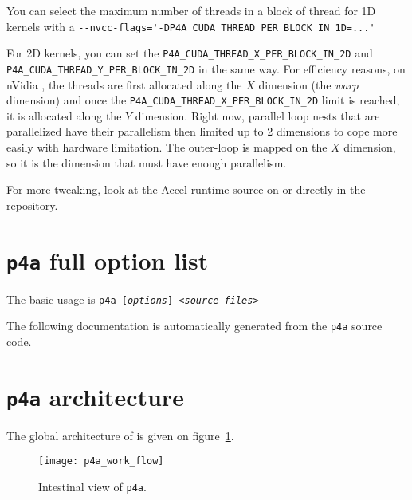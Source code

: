 \documentclass[a4paper]{article}
\begin{document}
You can select the maximum number of threads in a block of thread for 1D
kernels with a \verb|--nvcc-flags='-DP4A_CUDA_THREAD_PER_BLOCK_IN_1D=...'|

For 2D kernels, you can set the \verb|P4A_CUDA_THREAD_X_PER_BLOCK_IN_2D|
and \verb|P4A_CUDA_THREAD_Y_PER_BLOCK_IN_2D| in the same way. For
efficiency reasons, on nVidia \Agpu, the threads are first allocated along
the $X$ dimension (the \emph{warp} dimension) and once the
\verb|P4A_CUDA_THREAD_X_PER_BLOCK_IN_2D| limit is reached, it is allocated
along the $Y$ dimension. Right now, parallel loop nests that are
parallelized have their parallelism then limited up to 2 dimensions to
cope more easily with \Acuda \Agpu hardware limitation. The outer-loop is
mapped on the $X$ \Agpu dimension, so it is the dimension that must have
enough parallelism.

For more tweaking, look at the \Apfa Accel runtime source on \url{} or
directly in the \Agit repository.


\section{\protect\texttt{p4a} full option list}
\label{sec:options}

The basic usage is \texttt{p4a [\emph{options}] <\emph{source files}>}

The following documentation is automatically generated from the
\texttt{p4a} source code.




\section{\protect\texttt{p4a} architecture}
\label{sec:p4a-architecture}

The global architecture of \Apfa is given on
figure~\ref{fig:transit_intestinal}.

\begin{figure}
  \texttt{[image: p4a\_work\_flow]}
  \caption{Intestinal view of \texttt{p4a}.}
  \label{fig:transit_intestinal}
\end{figure}
\end{document}

